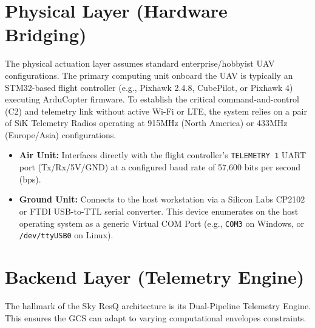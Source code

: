 \section{Physical Layer (Hardware Bridging)}
The physical actuation layer assumes standard enterprise/hobbyist UAV configurations. The primary computing unit onboard the UAV is typically an STM32-based flight controller (e.g., Pixhawk 2.4.8, CubePilot, or Pixhawk 4) executing ArduCopter firmware. 
To establish the critical command-and-control (C2) and telemetry link without active Wi-Fi or LTE, the system relies on a pair of SiK Telemetry Radios operating at 915MHz (North America) or 433MHz (Europe/Asia) configurations. 
\begin{itemize}
    \item \textbf{Air Unit:} Interfaces directly with the flight controller's \texttt{TELEMETRY 1} UART port (Tx/Rx/5V/GND) at a configured baud rate of 57,600 bits per second (bps).
    \item \textbf{Ground Unit:} Connects to the host workstation via a Silicon Labs CP2102 or FTDI USB-to-TTL serial converter. This device enumerates on the host operating system as a generic Virtual COM Port (e.g., \texttt{COM3} on Windows, or \texttt{/dev/ttyUSB0} on Linux).
\end{itemize}

\section{Backend Layer (Telemetry Engine)}
The hallmark of the Sky ResQ architecture is its Dual-Pipeline Telemetry Engine. This ensures the GCS can adapt to varying computational envelopes constraints.

